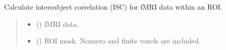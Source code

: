 \documentclass[letterpaper,10pt,english]{sphinxhowto}
\begin{document}
\begin{fulllineitems}
\label{\detokenize{isc_cal:neurora.isc_cal.isc_fmri_roi}}
\pysigstartsignatures
{}
\pysigstopsignatures
\sphinxAtStartPar
Calculate inter\sphinxhyphen{}subject correlation (ISC) for fMRI data within an ROI.
\begin{quote}\begin{description}
\begin{itemize}
\item {} 
\sphinxAtStartPar
{} (\sphinxstyleliteralemphasis{\sphinxupquote{, }}\sphinxstyleliteralemphasis{\sphinxupquote{ {[}}}\sphinxstyleliteralemphasis{\sphinxupquote{, }}\sphinxstyleliteralemphasis{\sphinxupquote{, }}\sphinxstyleliteralemphasis{\sphinxupquote{, }}\sphinxstyleliteralemphasis{\sphinxupquote{, }}\sphinxstyleliteralemphasis{\sphinxupquote{{]}}}) \textendash{} fMRI data.

\item {} 
\sphinxAtStartPar
{} (\sphinxstyleliteralemphasis{\sphinxupquote{, }}\sphinxstyleliteralemphasis{\sphinxupquote{ {[}}}\sphinxstyleliteralemphasis{\sphinxupquote{, }}\sphinxstyleliteralemphasis{\sphinxupquote{, }}\sphinxstyleliteralemphasis{\sphinxupquote{{]}}}) \textendash{} ROI mask. Non\sphinxhyphen{}zero and finite voxels are included.


\end{itemize}
\end{description}
\end{quote}
\end{fulllineitems}
\end{document}
